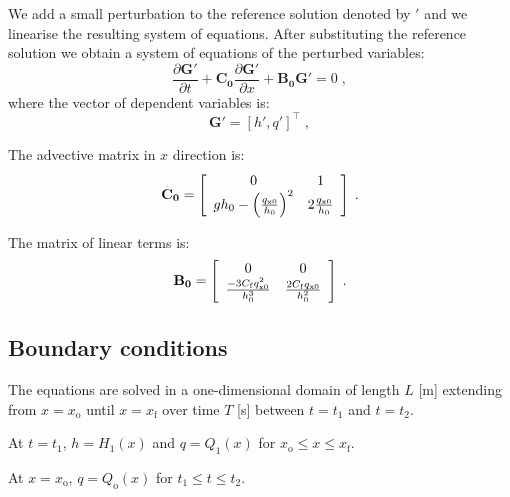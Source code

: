 \documentclass{deltares_report_elv}
\newcommand{\mathsub}[2]{#1_{\mathrm{#2}}}
\begin{document}
We add a small perturbation to the reference solution denoted by $'$ and we linearise the resulting system of equations. After substituting the reference solution we obtain a system of equations of the perturbed variables:
\begin{equation}
\label{eq:matrixf_sf}
	\frac{\partial \mathbf{G'}}{\partial t}+\mathbf{C_{0}}\frac{\partial \mathbf{G'}}{\partial x}+\mathbf{B_0}\mathbf{G'}=0 \;,
\end{equation}
where the vector of dependent variables is:
\begin{equation}
\label{eq:Q_l}
	\mathbf{G'}=\left[h',q'\right]^{\intercal} \;,
\end{equation}

The advective matrix in $x$ direction is:
\begin{equation}
\label{eq:Ax_sf}
\makebox[\textwidth][c]{$
		\mathbf{C_{0}}=\left[
 \begin{array}{cc}
  0 & 1  \\
	gh_0-\left(\frac{q_{\mathrm{x}0}}{h_0}\right)^2 & 2\frac{q_{\mathrm{x}0}}{h_0} \\
 \end{array}\right] \;.
$}
\end{equation}

The matrix of linear terms is:
\begin{equation}
\label{eq:B}
\makebox[\textwidth][c]{$
		\mathbf{B_0}=\left[
		\begin{array}{cc}
  0 & 0 \\
	\frac{-3C_{\mathrm{f}}q_{\mathrm{x}0}^2}{h_0^3} & \frac{2C_{\mathrm{f}}q_{\mathrm{x}0}}{h_0^2} \\
 \end{array}\right] \;.
$}
\end{equation}

\subsection{Boundary conditions}

The equations are solved in a one-dimensional domain of length $L$ [\si{m}] extending from $x=\mathsub{x}{o}$ until $x=\mathsub{x}{f}$ over time $T$ [\si{s}] between $t=\mathsub{t}{1}$ and $t=\mathsub{t}{2}$.

At $t=\mathsub{t}{1}$, $h=\mathsub{H}{1}(x)$ and $q=\mathsub{Q}{1}(x)$ for $\mathsub{x}{o}\leq x \leq\mathsub{x}{f}$.

At $x=\mathsub{x}{o}$, $q=\mathsub{Q}{o}(x)$ for $\mathsub{t}{1}\leq t \leq\mathsub{t}{2}$.
\end{document}
